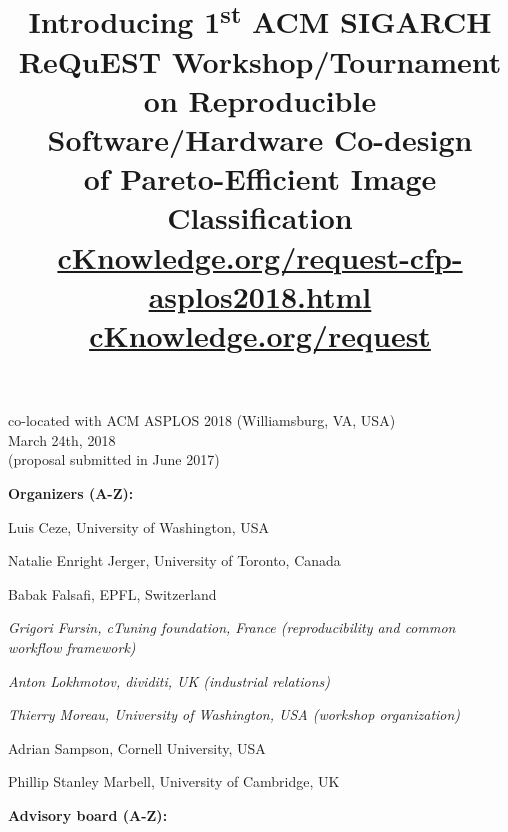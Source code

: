 \documentclass[10pt,onecolumn]{article}
\date{}
\newenvironment{packed_itemize}{
\begin{itemize}
  \setlength{\itemsep}{1pt}
  \setlength{\parskip}{0pt}
  \setlength{\parsep}{0pt}
}{\end{itemize}}
\begin{document}
\title{Introducing 1\textsuperscript{st} ACM SIGARCH ReQuEST Workshop/Tournament \\
on Reproducible Software/Hardware Co-design \\
of Pareto-Efficient Image Classification\\[.5cm]
\textbf{\href{http://cKnowledge.org/request-cfp-asplos2018.html}{cKnowledge.org/request-cfp-asplos2018.html}}
\textbf{\href{http://cKnowledge.org/request}{cKnowledge.org/request}}
}

\author{}

\maketitle
\thispagestyle{empty}
\pagestyle{empty}

\begin{center}
co-located with ACM ASPLOS 2018 (Williamsburg, VA, USA) \\
March 24th, 2018 \\
(proposal submitted in June 2017)
\end{center}

\textbf{Organizers (A-Z):}

\begin{packed_itemize}

 \item Luis Ceze, University of Washington, USA
 \item Natalie Enright Jerger, University of Toronto, Canada
 \item Babak Falsafi, EPFL, Switzerland
 \item \textit{Grigori Fursin, cTuning foundation, France (reproducibility and common workflow framework)}
 \item \textit{Anton Lokhmotov, dividiti, UK (industrial relations)}
 \item \textit{Thierry Moreau, University of Washington, USA (workshop organization)}
 \item Adrian Sampson, Cornell University, USA
 \item Phillip Stanley Marbell, University of Cambridge, UK 

\end{packed_itemize}

\textbf{Advisory board (A-Z):}
\end{document}
